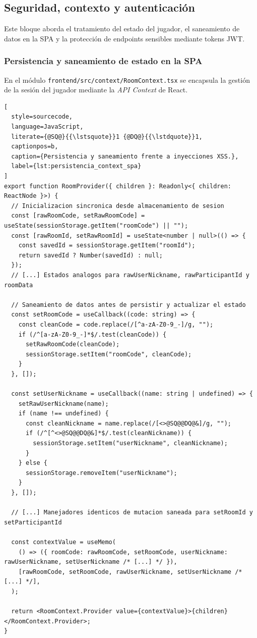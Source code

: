 \subsection{Seguridad, contexto y autenticación}\label{subsec:impl_security_context}

Este bloque aborda el tratamiento del estado del jugador, el saneamiento de datos en la SPA y la protección de endpoints sensibles mediante tokens JWT.

\subsubsection{Persistencia y saneamiento de estado en la SPA}
En el módulo \texttt{frontend/src/context/RoomContext.tsx} se encapsula la gestión de la sesión del jugador mediante la \textit{API Context} de React.

\begin{lstlisting}[
  style=sourcecode,
  language=JavaScript,
  literate={@SQ@}{{\lstsquote}}1 {@DQ@}{{\lstdquote}}1,
  captionpos=b,
  caption={Persistencia y saneamiento frente a inyecciones XSS.},
  label={lst:persistencia_context_spa}
]
export function RoomProvider({ children }: Readonly<{ children: ReactNode }>) {
  // Inicializacion sincronica desde almacenamiento de sesion
  const [rawRoomCode, setRawRoomCode] = useState(sessionStorage.getItem("roomCode") || "");
  const [rawRoomId, setRawRoomId] = useState<number | null>(() => {
    const savedId = sessionStorage.getItem("roomId");
    return savedId ? Number(savedId) : null;
  });
  // [...] Estados analogos para rawUserNickname, rawParticipantId y roomData

  // Saneamiento de datos antes de persistir y actualizar el estado
  const setRoomCode = useCallback((code: string) => {
    const cleanCode = code.replace(/[^a-zA-Z0-9_-]/g, "");
    if (/^[a-zA-Z0-9_-]*$/.test(cleanCode)) {
      setRawRoomCode(cleanCode);
      sessionStorage.setItem("roomCode", cleanCode);
    }
  }, []);

  const setUserNickname = useCallback((name: string | undefined) => {
    setRawUserNickname(name);
    if (name !== undefined) {
      const cleanNickname = name.replace(/[<>@SQ@@DQ@&]/g, "");
      if (/^[^<>@SQ@@DQ@&]*$/.test(cleanNickname)) {
        sessionStorage.setItem("userNickname", cleanNickname);
      }
    } else {
      sessionStorage.removeItem("userNickname");
    }
  }, []);

  // [...] Manejadores identicos de mutacion saneada para setRoomId y setParticipantId

  const contextValue = useMemo(
    () => ({ roomCode: rawRoomCode, setRoomCode, userNickname: rawUserNickname, setUserNickname /* [...] */ }),
    [rawRoomCode, setRoomCode, rawUserNickname, setUserNickname /* [...] */],
  );

  return <RoomContext.Provider value={contextValue}>{children}</RoomContext.Provider>;
}
\end{lstlisting}


